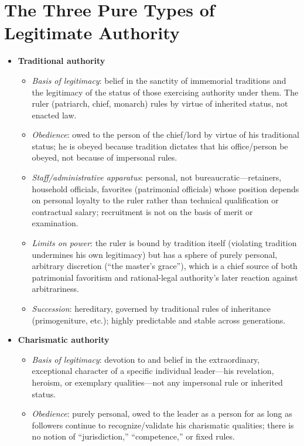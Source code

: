 \documentclass[12pt]{article}
\begin{document}
\section{The Three Pure Types of Legitimate Authority}

\begin{itemize}[leftmargin=*, itemsep=4pt]
    \item \textbf{Traditional authority}
    \begin{itemize}
        \item \textit{Basis of legitimacy}: belief in the sanctity of immemorial traditions and the legitimacy of the status of those exercising authority under them. The ruler (patriarch, chief, monarch) rules by virtue of inherited status, not enacted law.
        \item \textit{Obedience}: owed to the person of the chief/lord by virtue of his traditional status; he is obeyed because tradition dictates that his office/person be obeyed, not because of impersonal rules.
        \item \textit{Staff/administrative apparatus}: personal, not bureaucratic---retainers, household officials, favorites (patrimonial officials) whose position depends on personal loyalty to the ruler rather than technical qualification or contractual salary; recruitment is not on the basis of merit or examination.
        \item \textit{Limits on power}: the ruler is bound by tradition itself (violating tradition undermines his own legitimacy) but has a sphere of purely personal, arbitrary discretion (``the master's grace''), which is a chief source of both patrimonial favoritism and rational-legal authority's later reaction against arbitrariness.
        \item \textit{Succession}: hereditary, governed by traditional rules of inheritance (primogeniture, etc.); highly predictable and stable across generations.
    \end{itemize}
    \item \textbf{Charismatic authority}
    \begin{itemize}
        \item \textit{Basis of legitimacy}: devotion to and belief in the extraordinary, exceptional character of a specific individual leader---his revelation, heroism, or exemplary qualities---not any impersonal rule or inherited status.
        \item \textit{Obedience}: purely personal, owed to the leader as a person for as long as followers continue to recognize/validate his charismatic qualities; there is no notion of ``jurisdiction,'' ``competence,'' or fixed rules.

\end{itemize}
\end{itemize}
\end{document}
